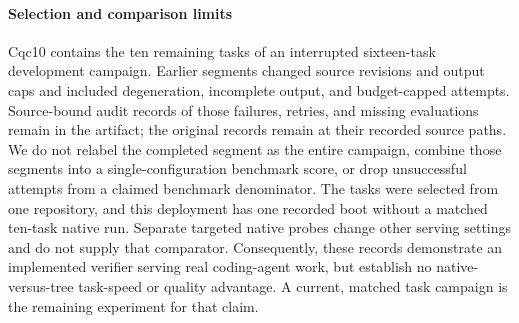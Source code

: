 \paragraph{Selection and comparison limits}
Cqc10 contains the ten remaining tasks of an interrupted sixteen-task development campaign. Earlier segments changed source revisions and output caps and included degeneration, incomplete output, and budget-capped attempts. Source-bound audit records of those failures, retries, and missing evaluations remain in the artifact; the original records remain at their recorded source paths. We do not relabel the completed segment as the entire campaign, combine those segments into a single-configuration benchmark score, or drop unsuccessful attempts from a claimed benchmark denominator. The tasks were selected from one repository, and this deployment has one recorded boot without a matched ten-task native run. Separate targeted native probes change other serving settings and do not supply that comparator. Consequently, these records demonstrate an implemented verifier serving real coding-agent work, but establish no native-versus-tree task-speed or quality advantage. A current, matched task campaign is the remaining experiment for that claim.
